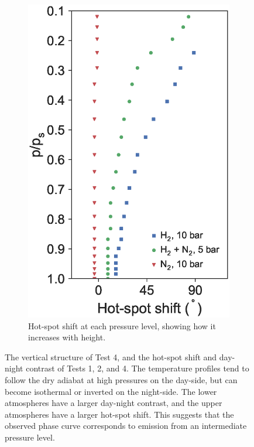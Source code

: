 \begin{figure}
\begin{subfigure}[t]{0.32\textwidth}
    \includegraphics[width=\textwidth]{figures/linking-climate-55cnce/hotspotlocation.eps}
    \caption{Hot-spot shift at each pressure level, showing how it increases with height.}
    \label{fig:hss-pressure}
  \end{subfigure}
  \caption{The vertical structure of Test 4, and the hot-spot shift and day-night contrast of Tests 1, 2, and 4. The temperature profiles tend to follow the dry adiabat at high pressures on the day-side, but can become isothermal or inverted on the night-side. The lower atmospheres have a larger day-night contrast, and the upper atmospheres have a larger hot-spot shift. This suggests that the observed phase curve corresponds to emission from an intermediate pressure level.}
\label{fig:pressure_variation}
\end{figure}



